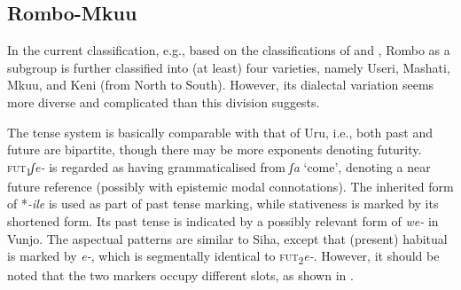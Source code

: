 \documentclass[output=paper]{langscibook}
\begin{document}
\subsection{Rombo-Mkuu}\label{sec:shinagawa:2.4}

In the current classification, e.g., \citet{Maho2009} based on the classifications of \citet{Nurse1981} and \citet{PhilippsonMontlahuc2003}, Rombo as a subgroup is further classified into (at least) four varieties, namely Useri, Mashati, Mkuu, and Keni (from North to South). However, its dialectal variation seems more diverse and complicated than this division suggests.

The tense system is basically comparable with that of Uru, i.e., both past and future are bipartite, though there may be more exponents denoting futurity. \textsc{fut}\textsubscript{1}\textit{ʃe-} is regarded as having grammaticalised from \textit{ʃa} ‘come’, denoting a near future reference (possibly with epistemic modal connotations). The inherited form of *\textit{{}-ile} is used as part of past tense marking, while stativeness is marked by its shortened form. Its past tense is indicated by a possibly relevant form of \textit{we-} in Vunjo. The aspectual patterns are similar to Siha, except that (present) habitual is marked by \textit{e-}, which is segmentally identical to \textsc{fut}\textsubscript{2}\textit{e-}. However, it should be noted that the two markers occupy different slots, as shown in .
\end{document}

